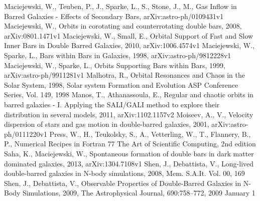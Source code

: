 \documentclass[a4paper,12pt]{article}
\begin{document}
\begin{thebibliography}{1}
Maciejewski, W., Teuben, P., J., Sparke, L., S., Stone, J., M., Gas Inflow in Barred Galaxies - Effects of Secondary Bars, arXiv:astro-ph/0109431v1
Maciejewski, W., Orbits in corotating and counterrotating double bars, 2008, arXiv:0801.1471v1
Maciejewski, W., Small, E., Orbital Support of Fast and Slow Inner Bars in Double Barred Galaxies, 2010, arXiv:1006.4574v1
Maciejewski, W., Sparke, L., Bars within Bars in Galaxies, 1998, arXiv:astro-ph/9812228v1
Maciejewski, W., Sparke, L., Orbits Supporting Bars within Bars, 1999, arXiv:astro-ph/9911281v1
Malhotra, R., Orbital Resonances and Chaos in the Solar System, 1998, Solar system Formation and Evolution ASP Conference Series, Vol. 149, 1998
Manos, T., Athanassoula, E., Regular and chaotic orbits in barred galaxies - I. Applying the SALI/GALI method to explore their distribution in several models, 2011, arXiv:1102.1157v2
Moiseev, A., V., Velocity dispersion of stars and gas motion in double-barred galaxies, 2001, arXiv:astro-ph/0111220v1
Press, W., H., Teukolsky, S., A., Vetterling, W., T., Flannery, B., P., Numerical Recipes in Fortran 77 The Art of Scientific Computing, 2nd edition
Saha, K., Maciejewski, W., Spontaneous formation of double bars in dark matter dominated galaxies, 2013, arXiv:1304.7108v1
Shen, J., Debattista, V., Long-lived double-barred galaxies in N-body simulations, 2008, Mem. S.A.It. Vol. 00, 169
Shen, J., Debattista, V., Observable Properties of Double-Barred Galaxies in N-Body Simulations, 2009, The Astrophysical Journal, 690:758–772, 2009 January 1

\end{thebibliography}
\end{document}
